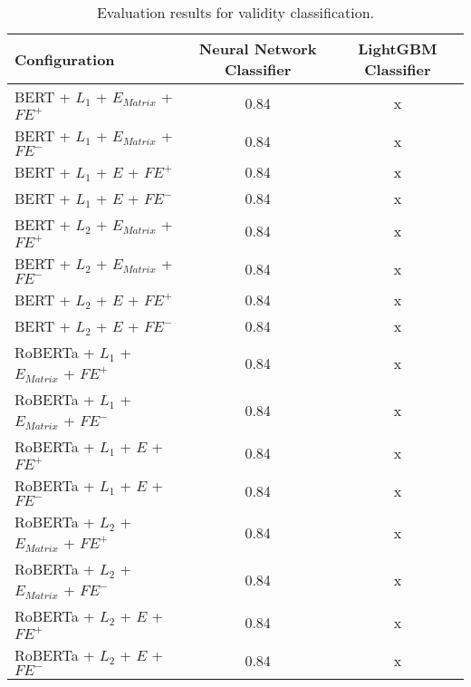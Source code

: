 \begin{table}[H]
  \begin{center}
  	\renewcommand{\arraystretch}{1.2}
   	\begin{tabular}{|| l || c | c ||}
   	\hline
   	{\small Configuration} & {\small Neural Network Classifier} & {\small LightGBM Classifier} \\
   	\hline\hline
   	BERT + $L_1$ + $E_{Matrix}$ + $\textit{FE}^+$ & 0.84 & x \\
 	\hline
 	BERT + $L_1$ + $E_{Matrix}$ + $\textit{FE}^-$ & 0.84 & x \\
 	\hline
 	BERT + $L_1$ + $E$ + $\textit{FE}^+$ & 0.84 & x \\
 	\hline
 	BERT + $L_1$ + $E$ + $\textit{FE}^-$ & 0.84 & x \\
 	\hline
 	BERT + $L_2$ + $E_{Matrix}$ + $\textit{FE}^+$ & 0.84 & x \\
 	\hline
 	BERT + $L_2$ + $E_{Matrix}$ + $\textit{FE}^-$ & 0.84 & x \\
 	\hline
 	BERT + $L_2$ + $E$ + $\textit{FE}^+$ & 0.84 & x \\
 	\hline
 	BERT + $L_2$ + $E$ + $\textit{FE}^-$ & 0.84 & x \\
 	\hline
 	RoBERTa + $L_1$ + $E_{Matrix}$ + $\textit{FE}^+$ & 0.84 & x \\
 	\hline
 	RoBERTa + $L_1$ + $E_{Matrix}$ + $\textit{FE}^-$ & 0.84 & x \\
 	\hline
 	RoBERTa + $L_1$ + $E$ + $\textit{FE}^+$ & 0.84 & x \\
 	\hline
 	RoBERTa + $L_1$ + $E$ + $\textit{FE}^-$ & 0.84 & x \\
 	\hline
 	RoBERTa + $L_2$ + $E_{Matrix}$ + $\textit{FE}^+$ & 0.84 & x \\
 	\hline
 	RoBERTa + $L_2$ + $E_{Matrix}$ + $\textit{FE}^-$ & 0.84 & x \\
 	\hline
 	RoBERTa + $L_2$ + $E$ + $\textit{FE}^+$ & 0.84 & x \\
 	\hline
 	RoBERTa + $L_2$ + $E$ + $\textit{FE}^-$ & 0.84 & x \\
 	\hline
	\end{tabular}
	\renewcommand{\arraystretch}{1}
  \end{center}
  \caption{Evaluation results for validity classification.}%
  \label{fig:validityresults}
\end{table}

